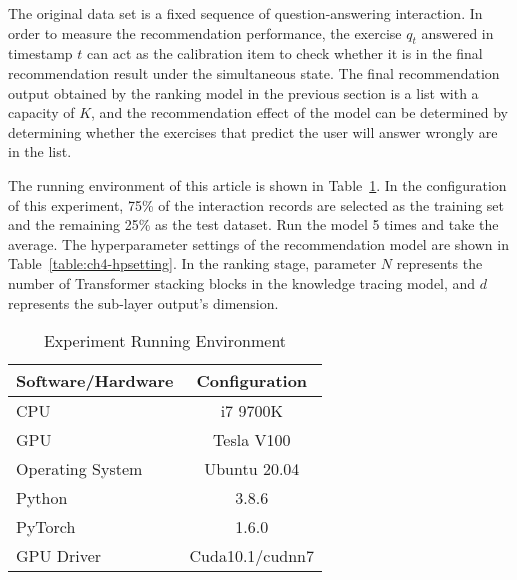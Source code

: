 The original data set is a fixed sequence of question-answering interaction. In order to measure the recommendation performance, the exercise \(q_t\) answered in timestamp \(t\) can act as the calibration item to check whether it is in the final recommendation result under the simultaneous state. The final recommendation output obtained by the ranking model in the previous section is a list with a capacity of \(K\), and the recommendation effect of the model can be determined by determining whether the exercises that predict the user will answer wrongly are in the list.


The running environment of this article is shown in Table~\ref{table:ch4-exp-env}. In the configuration of this experiment, 75\% of the interaction records are selected as the training set and the remaining 25\% as the test dataset. Run the model 5 times and take the average. The hyperparameter settings of the recommendation model are shown in Table~\ref{table:ch4-hpsetting}. In the ranking stage, parameter \(N\) represents the number of Transformer stacking blocks in the knowledge tracing model, and \(d\) represents the sub-layer output's dimension.

\begin{table}[htbp!]
  \caption{Experiment Running Environment}\label{table:ch4-exp-env}
  \centering
  \begin{tabular}{l c}
    \toprule
    Software/Hardware & Configuration   \\
    \midrule
    CPU               & i7 9700K        \\

    GPU               & Tesla V100      \\

    Operating System  & Ubuntu 20.04    \\

    Python            & 3.8.6           \\

    PyTorch           & 1.6.0           \\

    GPU Driver        & Cuda10.1/cudnn7 \\
    \bottomrule
  \end{tabular}
\end{table}

